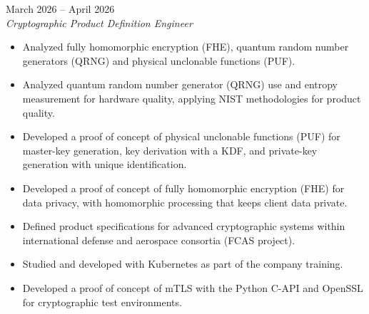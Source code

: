 \documentclass[11pt,a4paper]{article}
\newenvironment{job}[3]{%
  \vspace{0.55em}%
  \noindent{\bfseries #1}\hfill{\color{cvaccent}#2}\\[0.1em]
  \textit{#3}\par
  \begin{itemize}
}{%
  \end{itemize}
}
\begin{document}
\begin{job}{Indra}{March 2026 -- April 2026}{Cryptographic Product Definition Engineer}
  \item Analyzed fully homomorphic encryption (FHE), quantum random number generators (QRNG) and physical unclonable functions (PUF).
  \item Analyzed quantum random number generator (QRNG) use and entropy measurement for hardware quality, applying NIST methodologies for product quality.
  \item Developed a proof of concept of physical unclonable functions (PUF) for master-key generation, key derivation with a KDF, and private-key generation with unique identification.
  \item Developed a proof of concept of fully homomorphic encryption (FHE) for data privacy, with homomorphic processing that keeps client data private.
  \item Defined product specifications for advanced cryptographic systems within international defense and aerospace consortia (FCAS project).
  \item Studied and developed with Kubernetes as part of the company training.
  \item Developed a proof of concept of mTLS with the Python C-API and OpenSSL for cryptographic test environments.
\end{job}
\end{document}
